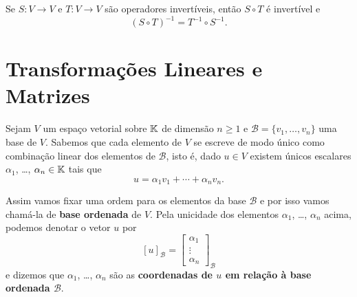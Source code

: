 \begin{proposicao}
  Se $S \colon V \to V$ e $T \colon V \to V$  são operadores invertíveis,  então $S \circ T$ é invertível e
  \[
    (S \circ T)^{-1}  = T^{-1}  \circ S^{-1}.
  \]
\end{proposicao}

\section{Transformações Lineares e Matrizes} %
\label{sec:transformacoes_lineares_e_matrizes}

Sejam $V$ um espaço vetorial sobre $\mathbb{K}$ de dimensão $n \ge 1$ e $\mathcal{B} = \{v_1,\dots,v_n\}$ uma base de $V$. Sabemos que cada elemento de $V$ se escreve de modo único como combinação linear dos elementos de $\mathcal{B}$, isto é, dado $u \in V$ existem únicos escalares $\alpha_1$, \dots, $\alpha_n \in \mathbb{K}$ tais que
\[
  u = \alpha_1v_1 + \cdots + \alpha_nv_n.
\]

Assim vamos fixar uma ordem para os elementos da base $\mathcal{B}$ e por isso vamos chamá-la de \textbf{base ordenada} de $V$. Pela unicidade dos elementos $\alpha_1$, \dots, $\alpha_n$ acima, podemos denotar o vetor $u$ por
\[
  [u]_\mathcal{B} = \begin{bmatrix}
    \alpha_1\\
    \vdots\\
    \alpha_n
  \end{bmatrix}_\mathcal{B}
\]
e dizemos que $\alpha_1$, \dots, $\alpha_n$ são as \textbf{coordenadas de $u$ em relação \`a base ordenada $\mathcal{B}$}.

